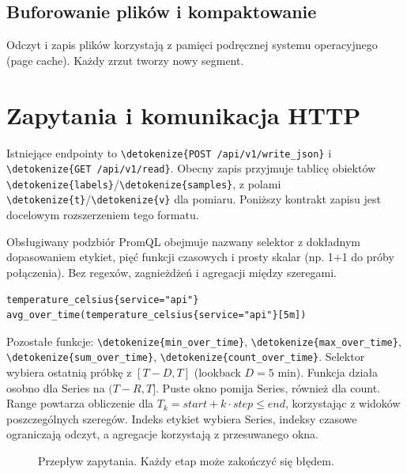 \documentclass[11pt,a4paper]{article}
\newcommand{\code}[1]{\expandafter\nolinkurl\expandafter{\detokenize{#1}}}
\begin{document}
\subsection{Buforowanie plików i kompaktowanie}
Odczyt i zapis plików korzystają z pamięci podręcznej systemu operacyjnego
(page cache).
Każdy zrzut tworzy nowy segment.

\section{Zapytania i komunikacja HTTP}
\label{sec:language}
\label{sec:http}

Istniejące endpointy to \code{POST /api/v1/write_json}
i \code{GET /api/v1/read}. Obecny zapis przyjmuje tablicę obiektów
\code{labels}/\code{samples}, z polami \code{t}/\code{v} dla pomiaru.
Poniższy kontrakt zapisu jest docelowym rozszerzeniem tego formatu.

Obsługiwany podzbiór PromQL obejmuje nazwany selektor
z dokładnym dopasowaniem etykiet, pięć funkcji czasowych i prosty skalar
(np. 1+1 do próby połączenia). Bez regexów, zagnieżdżeń i agregacji
między szeregami.
\begin{lstlisting}
temperature_celsius{service="api"}
avg_over_time(temperature_celsius{service="api"}[5m])
\end{lstlisting}
Pozostałe funkcje: \code{min_over_time}, \code{max_over_time},
\code{sum_over_time}, \code{count_over_time}.
Selektor wybiera ostatnią próbkę z $[T-D,T]$ (lookback $D=5$ min).
Funkcja działa osobno dla Series na $(T-R,T]$. Puste okno pomija Series,
również dla count. Range powtarza obliczenie dla
$T_k=start+k\cdot step\leq end$, korzystając z widoków poszczególnych szeregów.
Indeks etykiet wybiera Series, indeksy czasowe ograniczają odczyt,
a agregacje korzystają z przesuwanego okna.

\begin{figure}[!htbp]
  \centering
  \caption{Przepływ zapytania. Każdy etap może zakończyć się błędem.}
\end{figure}
\end{document}
